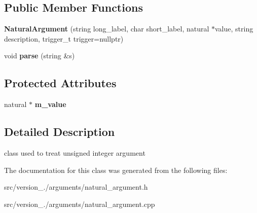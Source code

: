 \subsection*{Public Member Functions}
\begin{DoxyCompactItemize}
\item 
\mbox{\label{classez_1_1arguments_1_1NaturalArgument_aebf8b9391aaecb4d8ffaffff4f857600}} 
{\bfseries Natural\+Argument} (string long\+\_\+label, char short\+\_\+label, natural $\ast$value, string description, trigger\+\_\+t trigger=nullptr)
\item 
\mbox{\label{classez_1_1arguments_1_1NaturalArgument_a718b7c1d00a3d43285ce75beb0f5bd45}} 
void {\bfseries parse} (string \&s)
\end{DoxyCompactItemize}
\subsection*{Protected Attributes}
\begin{DoxyCompactItemize}
\item 
\mbox{\label{classez_1_1arguments_1_1NaturalArgument_aa2203f8617e64f6a52f447462a0b8df3}} 
natural $\ast$ {\bfseries m\+\_\+value}
\end{DoxyCompactItemize}


\subsection{Detailed Description}
class used to treat unsigned integer argument 

The documentation for this class was generated from the following files\+:\begin{DoxyCompactItemize}
\item 
src/version\+\_./arguments/natural\+\_\+argument.\+h\item 
src/version\+\_./arguments/natural\+\_\+argument.\+cpp\end{DoxyCompactItemize}
